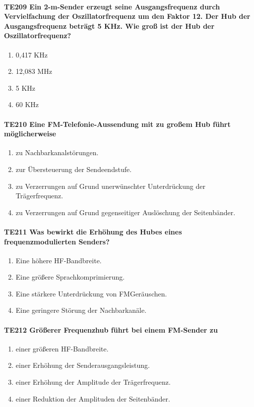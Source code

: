 \documentclass[8pt]{article}
\begin{document}
\begin{enumerate}
\begin{enumerate}[nolistsep,label=\Alph*]
\paragraph*{TE209 Ein 2-m-Sender erzeugt seine Ausgangsfrequenz durch Vervielfachung der Oszillatorfrequenz um den Faktor 12. Der Hub der Ausgangsfrequenz beträgt 5 KHz. Wie groß ist der Hub der Oszillatorfrequenz?}
\begin{enumerate}[nolistsep,label=\Alph*]
\item 0,417 KHz
\item 12,083 MHz
\item 5 KHz
\item 60 KHz
\end{enumerate}

\paragraph*{TE210 Eine FM-Telefonie-Aussendung mit zu großem Hub führt möglicherweise}
\begin{enumerate}[nolistsep,label=\Alph*]
\item zu Nachbarkanalstörungen.
\item zur Übersteuerung der Sendeendstufe.
\item zu Verzerrungen auf Grund unerwünschter Unterdrückung der Trägerfrequenz.
\item zu Verzerrungen auf Grund gegenseitiger Auslöschung der Seitenbänder.
\end{enumerate}

\paragraph*{TE211 Was bewirkt die Erhöhung des Hubes eines frequenzmodulierten Senders?}
\begin{enumerate}[nolistsep,label=\Alph*]
\item Eine höhere HF-Bandbreite.
\item Eine größere Sprachkomprimierung.
\item Eine stärkere Unterdrückung von FMGeräuschen.
\item Eine geringere Störung der Nachbarkanäle.
\end{enumerate}

\paragraph*{TE212 Größerer Frequenzhub führt bei einem FM-Sender zu}
\begin{enumerate}[nolistsep,label=\Alph*]
\item einer größeren HF-Bandbreite.
\item einer Erhöhung der Senderausgangsleistung.
\item einer Erhöhung der Amplitude der Trägerfrequenz.
\item einer Reduktion der Amplituden der Seitenbänder.
\end{enumerate}


\end{enumerate}
\end{enumerate}
\end{document}
